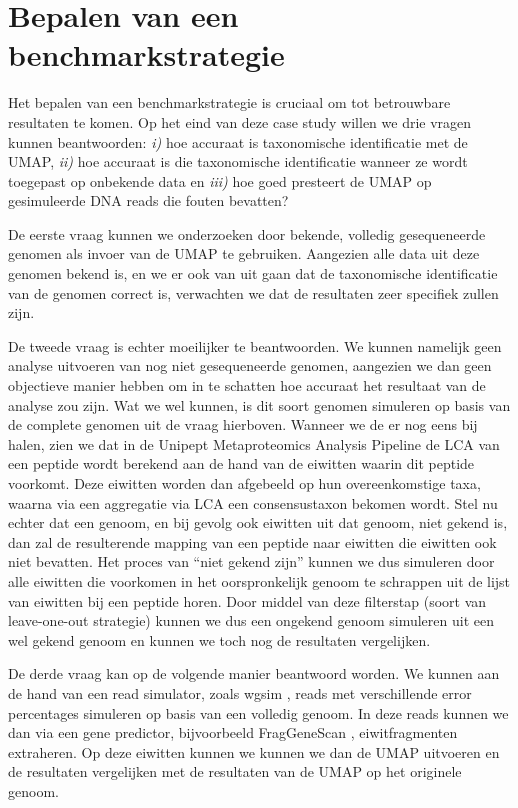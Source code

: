 \section[Bepalen van een benchmarkstrategie]{Bepalen van een benchmarkstrategie%
  }

Het bepalen van een benchmarkstrategie is cruciaal om tot betrouwbare resultaten
te komen. Op het eind van deze case study willen we drie vragen kunnen
beantwoorden: \textit{i)} hoe accuraat is taxonomische identificatie met de
UMAP, \textit{ii)} hoe accuraat is die taxonomische identificatie wanneer ze
wordt toegepast op onbekende data en \textit{iii)} hoe goed presteert de UMAP op
gesimuleerde DNA reads die fouten bevatten?

De eerste vraag kunnen we onderzoeken door bekende, volledig gesequeneerde
genomen als invoer van de UMAP te gebruiken. Aangezien alle data uit deze
genomen bekend is, en we er ook van uit gaan dat de taxonomische identificatie
van de genomen correct is, verwachten we dat de resultaten zeer specifiek zullen
zijn.

De tweede vraag is echter moeilijker te beantwoorden. We kunnen namelijk geen
analyse uitvoeren van nog niet gesequeneerde genomen, aangezien we dan geen
objectieve manier hebben om in te schatten hoe accuraat het resultaat van de
analyse zou zijn. Wat we wel kunnen, is dit soort genomen simuleren op basis van
de complete genomen uit de vraag hierboven. Wanneer we de  er
nog eens bij halen, zien we dat in de Unipept Metaproteomics Analysis Pipeline
de LCA van een peptide wordt berekend aan de hand van de eiwitten waarin dit
peptide voorkomt. Deze eiwitten worden dan afgebeeld op hun overeenkomstige
taxa, waarna via een aggregatie via LCA een consensustaxon bekomen wordt. Stel
nu echter dat een genoom, en bij gevolg ook eiwitten uit dat genoom, niet
gekend is, dan zal de resulterende mapping van een peptide naar eiwitten die
eiwitten ook niet bevatten. Het proces van ``niet gekend zijn'' kunnen we dus
simuleren door alle eiwitten die voorkomen in het oorspronkelijk genoom te
schrappen uit de lijst van eiwitten bij een peptide horen. Door middel van deze
filterstap (soort van leave-one-out strategie) kunnen we dus een ongekend genoom
simuleren uit een wel gekend genoom en kunnen we toch nog de resultaten
vergelijken.

De derde vraag kan op de volgende manier beantwoord worden. We kunnen aan de
hand van een read simulator, zoals wgsim \cite{lh3/w4:online}, reads met
verschillende error percentages simuleren op basis van een volledig genoom. In
deze reads kunnen we dan via een gene predictor, bijvoorbeeld FragGeneScan
\cite{rho2010fraggenescan}, eiwitfragmenten extraheren. Op deze eiwitten kunnen
we kunnen we dan de UMAP uitvoeren en de resultaten vergelijken met de
resultaten van de UMAP op het originele genoom.

